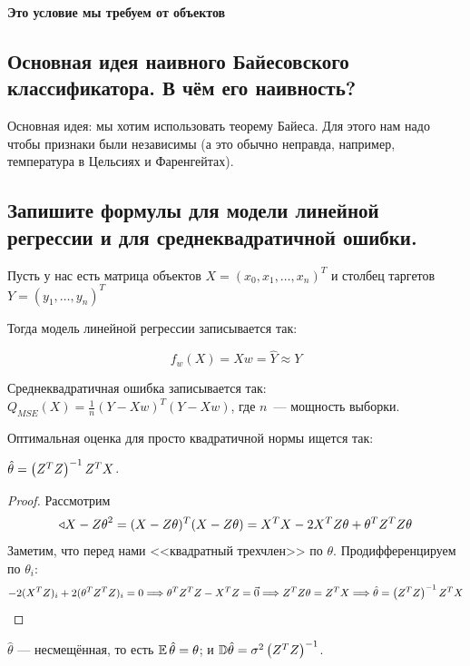 \textbf{Это условие мы требуем от объектов}





\subsection{Основная идея наивного Байесовского классификатора. В чём его наивность?}

Основная идея: мы хотим использовать теорему Байеса. Для этого нам надо чтобы признаки были независимы (а это обычно неправда, например, температура в Цельсиях и Фаренгейтах).





\subsection{Запишите формулы для модели линейной регрессии и для среднеквадратичной ошибки.}

Пусть у нас есть матрица объектов $X = (x_0, x_1, \ldots, x_n)^T$ и столбец таргетов $Y = (y_1, \ldots, y_n)^T$

Тогда модель линейной регрессии записывается так:

$$f_w(X) = Xw = \hat{Y} \approx Y$$

Среднеквадратичная ошибка записывается так: $Q_{MSE}(X) = \frac{1}{n}(Y - Xw)^T (Y-Xw)$, где $n$~--- мощность выборки. 

Оптимальная оценка для просто квадратичной нормы ищется так: 
\begin{lemma}
    $\hat{\theta} = \left({Z^T Z}\right)^{-1} Z^T X$.
\end{lemma}

\begin{proof}
    Рассмотрим
    \begin{equation*} \label{lreg_1}
    \triangleleft{X - Z\theta}^2 = (X - Z\theta)^T(X - Z\theta) = X^TX - 2X^TZ\theta + \theta^TZ^TZ\theta
    \end{equation*}
    Заметим, что перед нами <<квадратный трехчлен>> по $\theta$. Продифференцируем по $\theta_i$:
    \begin{equation*}
        -2(X^TZ)_i + 2(\theta^TZ^TZ)_i = 0 \Longrightarrow \theta^TZ^TZ - X^TZ = \vec{0} \Longrightarrow Z^TZ\theta = Z^TX \Longrightarrow \hat{\theta} = \left({Z^T Z}\right)^{-1} Z^T X
    \end{equation*}
\end{proof}
\begin{statement}
    $\hat{\theta}$ — несмещённая, то есть $\operatorname{\mathbb{E}}\hat{\theta} = \theta$; и $\mathbb{D}\hat{\theta} = \sigma^2\left({Z^T Z}\right)^{-1}$.
\end{statement}

